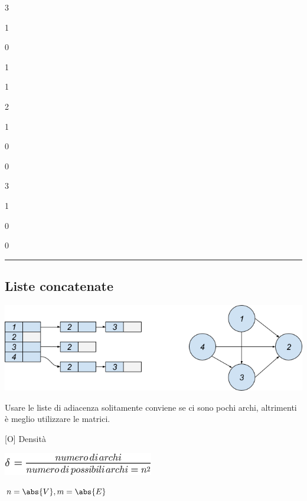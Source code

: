 \documentclass{article}
\begin{document}
{3}

{1}

{0}

{1}

{1}

{2}

{1}

{0}

{0}

{3}

{1}

{0}

{0}

{}

{}

\begin{center}\rule{0.5\linewidth}{\linethickness}\end{center}

\subsection{\texorpdfstring{{}}{}}\label{h.fq77zq901ude}

\hypertarget{h.qwq1tiruc9xg}{\subsection{\texorpdfstring{{Liste
concatenate}}{Liste concatenate}}\label{h.qwq1tiruc9xg}}

{}

{\includegraphics{images/image537.png}}

{}

{}

{Usare le liste di adiacenza solitamente conviene se ci sono pochi
archi, altrimenti è meglio utilizzare le matrici.}

{}

{{[}O{]} Densità}

\includegraphics{images/image391.png}

$n=\abs{V},m=\abs{E}$
\end{document}
